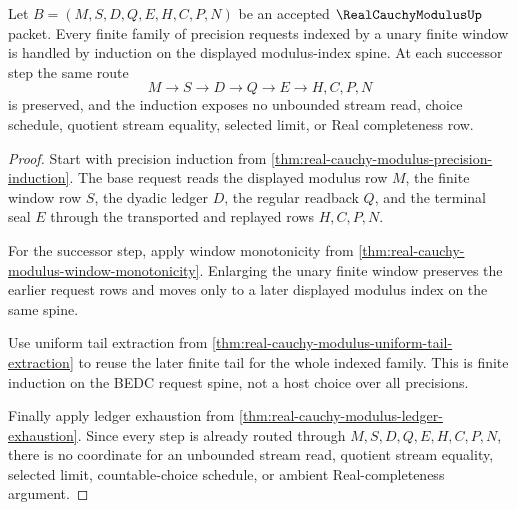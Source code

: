 \begin{theorem}
\label{thm:real-cauchy-modulus-finite-modulus-index-induction}
Let $B=(M,S,D,Q,E,H,C,P,N)$ be an accepted $\RealCauchyModulusUp$ packet. Every finite family of precision requests indexed by a unary finite window is handled by induction on the displayed modulus-index spine. At each successor step the same route
$$
M \to S \to D \to Q \to E \to H,C,P,N
$$
is preserved, and the induction exposes no unbounded stream read, choice schedule, quotient stream equality, selected limit, or Real completeness row.
\end{theorem}
\begin{proof}
Start with precision induction from \autoref{thm:real-cauchy-modulus-precision-induction}. The base request reads the displayed modulus row $M$, the finite window row $S$, the dyadic ledger $D$, the regular readback $Q$, and the terminal seal $E$ through the transported and replayed rows $H,C,P,N$.

For the successor step, apply window monotonicity from \autoref{thm:real-cauchy-modulus-window-monotonicity}. Enlarging the unary finite window preserves the earlier request rows and moves only to a later displayed modulus index on the same spine.

Use uniform tail extraction from \autoref{thm:real-cauchy-modulus-uniform-tail-extraction} to reuse the later finite tail for the whole indexed family. This is finite induction on the BEDC request spine, not a host choice over all precisions.

Finally apply ledger exhaustion from \autoref{thm:real-cauchy-modulus-ledger-exhaustion}. Since every step is already routed through $M,S,D,Q,E,H,C,P,N$, there is no coordinate for an unbounded stream read, quotient stream equality, selected limit, countable-choice schedule, or ambient Real-completeness argument.
\end{proof}

